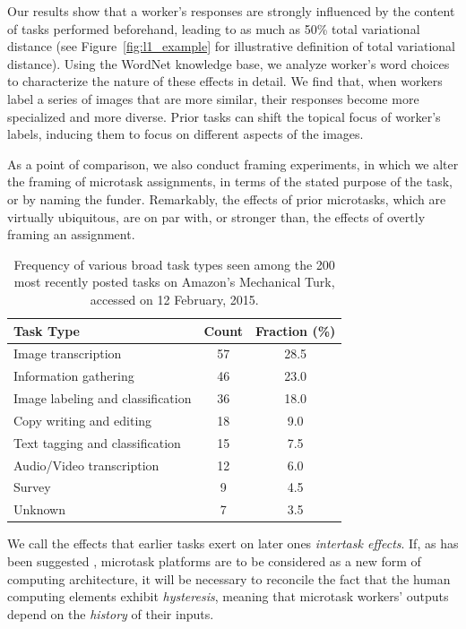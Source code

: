 \documentclass{sigchi}
\begin{document}
Our results show that a worker's responses are strongly influenced by 
the content of tasks performed beforehand, leading to as much as 50\%
total variational distance (see Figure~\ref{fig:l1_example} for 
illustrative definition of total variational distance).  
Using the WordNet 
knowledge base, we analyze worker's word choices to characterize 
the nature of these effects in detail.  We find that, when workers 
label a series of images that are more similar, their responses become 
more specialized and more diverse.  
Prior tasks can shift the topical focus of 
worker's labels, inducing them to focus on different aspects of the images.

As a point of comparison, we also conduct framing experiments, 
in which we alter the framing of microtask assignments, in terms of the 
stated purpose of the task, or by naming the funder.
Remarkably, the effects of prior microtasks,
which are virtually ubiquitous, are on par with, or stronger than, 
the effects of overtly framing an assignment.

\begin{table}
\centering
\begin{tabular}{l c c}
\toprule
Task Type & Count & Fraction (\%) \\
\toprule
Image transcription & 57 & 28.5 \\
Information gathering & 46 & 23.0 \\
Image labeling and classification & 36 & 18.0 \\
Copy writing and editing & 18 & 9.0 \\
Text tagging and classification & 15 & 7.5 \\
Audio/Video transcription & 12 & 6.0 \\
Survey & 9 & 4.5 \\
Unknown & 7 & 3.5 \\
\bottomrule
\end{tabular}
\caption{
	Frequency of various broad task types seen among the 200 most 
	recently posted tasks on Amazon's Mechanical Turk, 
	accessed on 12 February, 2015.
}
\label{table:task_composition}
\end{table}

We call the effects that earlier tasks exert on later ones 
\textit{intertask effects}.  If, as has been suggested \cite{5543192}, 
microtask platforms are to be considered as a new form of computing 
architecture, it will be necessary to reconcile the fact that the human 
computing elements exhibit \textit{hysteresis}, 
meaning that microtask workers' outputs 
depend on the \textit{history} of their inputs.
\end{document}

